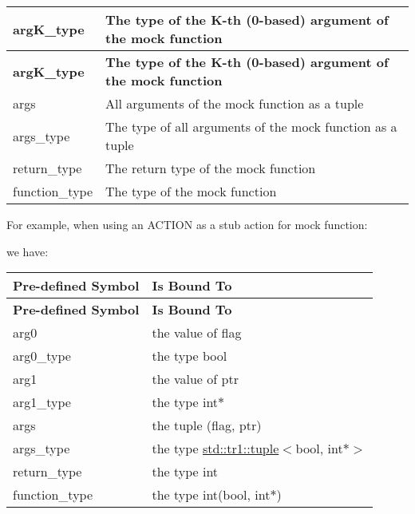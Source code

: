 \tabulinesep=1mm
\begin{longtabu}spread 0pt [c]{*{2}{|X[-1]}|}
\hline
\cellcolor{\tableheadbgcolor}\textbf{ {\ttfamily arg\+K\+\_\+type}  }&\cellcolor{\tableheadbgcolor}\textbf{ The type of the K-\/th (0-\/based) argument of the mock function   }\\
\endfirsthead
\hline
\endfoot
\hline
\cellcolor{\tableheadbgcolor}\textbf{ {\ttfamily arg\+K\+\_\+type}  }&\cellcolor{\tableheadbgcolor}\textbf{ The type of the K-\/th (0-\/based) argument of the mock function   }\\
\endhead
{\ttfamily args}  &All arguments of the mock function as a tuple   \\
{\ttfamily args\+\_\+type}  &The type of all arguments of the mock function as a tuple   \\
{\ttfamily return\+\_\+type}  &The return type of the mock function   \\
{\ttfamily function\+\_\+type}  &The type of the mock function   \\
\end{longtabu}


For example, when using an {\ttfamily A\+C\+T\+I\+ON} as a stub action for mock function\+: 
\begin{DoxyCode}{0}
\end{DoxyCode}
 we have\+: \tabulinesep=1mm
\begin{longtabu}spread 0pt [c]{*{2}{|X[-1]}|}
\hline
\cellcolor{\tableheadbgcolor}\textbf{ {\bfseries{Pre-\/defined Symbol}}  }&\cellcolor{\tableheadbgcolor}\textbf{ {\bfseries{Is Bound To}}   }\\
\endfirsthead
\hline
\endfoot
\hline
\cellcolor{\tableheadbgcolor}\textbf{ {\bfseries{Pre-\/defined Symbol}}  }&\cellcolor{\tableheadbgcolor}\textbf{ {\bfseries{Is Bound To}}   }\\
\endhead
{\ttfamily arg0}  &the value of {\ttfamily flag}   \\
{\ttfamily arg0\+\_\+type}  &the type {\ttfamily bool}   \\
{\ttfamily arg1}  &the value of {\ttfamily ptr}   \\
{\ttfamily arg1\+\_\+type}  &the type {\ttfamily int$\ast$}   \\
{\ttfamily args}  &the tuple {\ttfamily (flag, ptr)}   \\
{\ttfamily args\+\_\+type}  &the type {\ttfamily \mbox{\hyperlink{classstd_1_1tr1_1_1tuple}{std\+::tr1\+::tuple}}$<$bool, int$\ast$$>$}   \\
{\ttfamily return\+\_\+type}  &the type {\ttfamily int}   \\
{\ttfamily function\+\_\+type}  &the type {\ttfamily int(bool, int$\ast$)}   \\
\end{longtabu}



